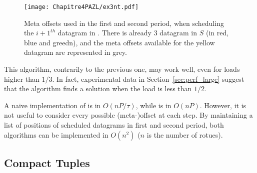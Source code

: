      \begin{figure}
      \begin{center}
      \texttt{[image: Chapitre4PAZL/ex3nt.pdf]}
      \end{center}
      \caption{Meta offsets used in the first and second period, when scheduling the $i+1^{th}$ datagram in \metaoffset. There is already 3 datagram in $S$ (in red, blue and greedn), and the meta offsets available for the yellow datagram are represented in grey.}
      \label{fig:metaoffset}
      \end{figure}

  
This algorithm, contrarily to the previous one, may work well, even for loads higher than $1/3$.
In fact, experimental data in Section~\ref{sec:perf_large} suggest that the algorithm finds a solution when the load is less than $1/2$.




A naive implementation of \metaoffset is in $O(n P/\tau)$, while \firstfit is in $O(nP)$.
However, it is not useful to consider every possible (meta-)offset at each step. By maintaining
a list of positions of scheduled datagrams in first and second period, both algorithms can be implemented in $O(n^2)$ ($n$ is the number of rotues).


\subsection{Compact Tuples}\label{sec:compacttuple}

